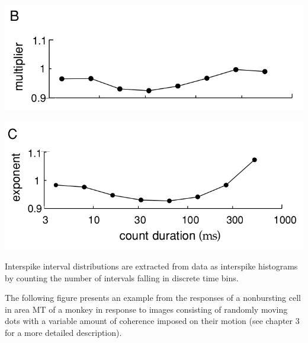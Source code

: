 \begin{center}
    \label{fig:1.14B}    
    \includegraphics[scale = 0.36]{png/Figure1-14-B.png}\\
\end{center}

\begin{center}
    \label{fig:1.14C}    
    \includegraphics[scale = 0.36]{png/Figure1-14-C.png}\\
\end{center}

\begin{alg}
    Interspike interval distributions are extracted from data as interspike histograms by counting the number of intervals falling in discrete time bins.
\end{alg}

\begin{exm}
    The following figure presents an example from the responses of a nonbursting cell in area MT of a monkey in response to images consisting of randomly moving dots with a variable amount of coherence imposed on
    their motion (see chapter $3$ for a more detailed description). 
\end{exm}

